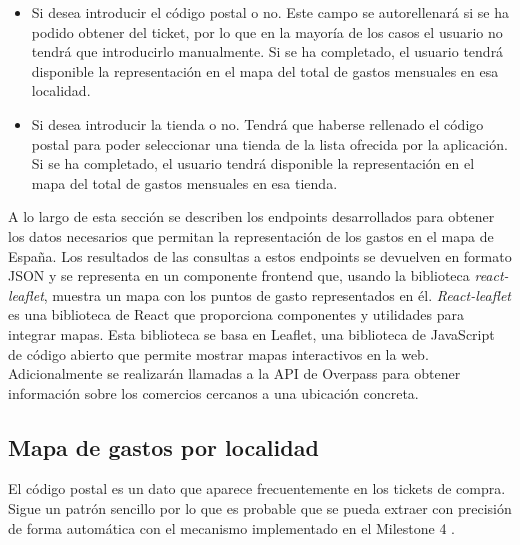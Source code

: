 \begin{itemize}
    \item Si desea introducir el código postal o no. Este campo se autorellenará si se ha podido obtener del ticket, por lo que en la mayoría de los casos el usuario no tendrá que introducirlo manualmente. Si se ha completado, el usuario tendrá disponible la representación en el mapa del total de gastos mensuales en esa localidad. 
    
    \item Si desea introducir la tienda o no. Tendrá que haberse rellenado el código postal para poder seleccionar una tienda de la lista ofrecida por la aplicación. Si se ha completado, el usuario tendrá disponible la representación en el mapa del total de gastos mensuales en esa tienda.
\end{itemize}

A lo largo de esta sección se describen los endpoints desarrollados para obtener los datos necesarios que permitan la representación de los gastos en el mapa de España. Los resultados de las consultas a estos endpoints se devuelven en formato JSON y se representa en un componente frontend que, usando la biblioteca \textit{react-leaflet}, muestra un mapa con los puntos de gasto representados en él. \textit{React-leaflet} es una biblioteca de React que proporciona componentes y utilidades para integrar mapas. Esta biblioteca se basa en Leaflet, una biblioteca de JavaScript de código abierto que permite mostrar mapas interactivos en la web. Adicionalmente se realizarán llamadas a la API de Overpass para obtener información sobre los comercios cercanos a una ubicación concreta.


\subsection{Mapa de gastos por localidad}
El código postal es un dato que aparece frecuentemente en los tickets de compra. Sigue un patrón sencillo por lo que es probable que se pueda extraer con precisión de forma automática con el mecanismo implementado en el Milestone 4 \label{codigo_postal}. 



